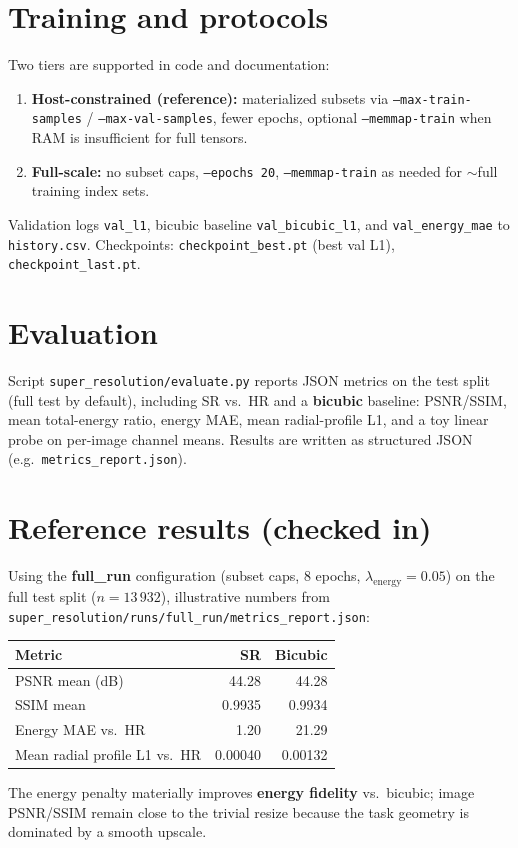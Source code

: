 \documentclass[11pt,a4paper]{article}
\begin{document}
\section{Training and protocols}
Two tiers are supported in code and documentation:
\begin{enumerate}
  \item \textbf{Host-constrained (reference):} materialized subsets via \texttt{--max-train-samples} / \texttt{--max-val-samples}, fewer epochs, optional \texttt{--memmap-train} when RAM is insufficient for full tensors.
  \item \textbf{Full-scale:} no subset caps, \texttt{--epochs 20}, \texttt{--memmap-train} as needed for $\sim$full training index sets.
\end{enumerate}
Validation logs \texttt{val\_l1}, bicubic baseline \texttt{val\_bicubic\_l1}, and \texttt{val\_energy\_mae} to \texttt{history.csv}. Checkpoints: \texttt{checkpoint\_best.pt} (best val L1), \texttt{checkpoint\_last.pt}.

\section{Evaluation}
Script \texttt{super\_resolution/evaluate.py} reports JSON metrics on the test split (full test by default), including SR vs.\ HR and a \textbf{bicubic} baseline: PSNR/SSIM, mean total-energy ratio, energy MAE, mean radial-profile L1, and a toy linear probe on per-image channel means. Results are written as structured JSON (e.g.\ \texttt{metrics\_report.json}).

\section{Reference results (checked in)}
Using the \textbf{full\_run} configuration (subset caps, 8 epochs, $\lambda_{\mathrm{energy}}=0.05$) on the full test split ($n=13\,932$), illustrative numbers from \texttt{super\_resolution/runs/full\_run/metrics\_report.json}:
\begin{center}
\begin{tabular}{@{}lrr@{}}
\toprule
Metric & SR & Bicubic \\
\midrule
PSNR mean (dB) & 44.28 & 44.28 \\
SSIM mean & 0.9935 & 0.9934 \\
Energy MAE vs.\ HR & 1.20 & 21.29 \\
Mean radial profile L1 vs.\ HR & 0.00040 & 0.00132 \\
\bottomrule
\end{tabular}
\end{center}
The energy penalty materially improves \textbf{energy fidelity} vs.\ bicubic; image PSNR/SSIM remain close to the trivial resize because the task geometry is dominated by a smooth upscale.
\end{document}
